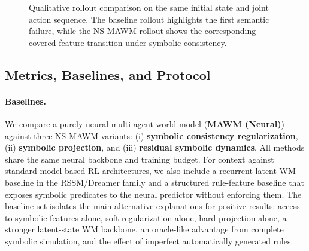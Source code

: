 \documentclass{article}
\theoremstyle{plain}
\theoremstyle{definition}
\theoremstyle{remark}
\begin{document}
\begin{figure}[t]
  \centering
  \setlength{\fboxsep}{2pt}
  \hfill
  \caption{Qualitative rollout comparison on the same initial state and joint action sequence. The baseline rollout highlights the first semantic failure, while the NS-MAWM rollout shows the corresponding covered-feature transition under symbolic consistency.}
  \label{fig:qualitative_rollout}
\end{figure}

\subsection{Metrics, Baselines, and Protocol}
\label{sec:metrics_baselines_protocol}

\paragraph{Baselines.}
We compare a purely neural multi-agent world model
(\textbf{MAWM (Neural)}) against three NS-MAWM variants:
(i) \textbf{symbolic consistency regularization},
(ii) \textbf{symbolic projection},
and (iii) \textbf{residual symbolic dynamics}.
All methods share the same neural backbone and training budget.
For context against standard model-based RL architectures, we also include a recurrent latent WM baseline in the RSSM/Dreamer family and a structured rule-feature baseline that exposes symbolic predicates to the neural predictor without enforcing them.
The baseline set isolates the main alternative explanations for positive results: access to symbolic features alone, soft regularization alone, hard projection alone, a stronger latent-state WM backbone, an oracle-like advantage from complete symbolic simulation, and the effect of imperfect automatically generated rules.
\end{document}
